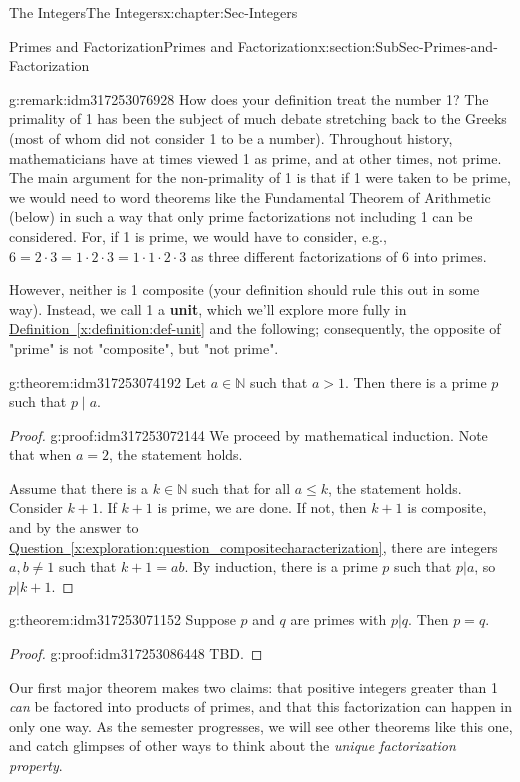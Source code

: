 \documentclass[oneside,10pt,]{book}
\newcommand{\xreffont}{\relax}
\newcommand{\terminology}[1]{\textbf{#1}}
\numberwithin{equation}{section}
\renewcommand{\le}{\leqslant}
\def\N{{\mathbb N}}
\begin{document}
\begin{chapterptx}{The Integers}{}{The Integers}{}{}{x:chapter:Sec-Integers}
\begin{sectionptx}{Primes and Factorization}{}{Primes and Factorization}{}{}{x:section:SubSec-Primes-and-Factorization}
\begin{remark}{}{g:remark:idm317253076928}%
How does your definition treat the number 1? The primality of 1 has been the subject of much debate stretching back to the Greeks (most of whom did not consider 1 to be a number). Throughout history, mathematicians have at times viewed 1 as prime, and at other times, not prime. The main argument for the non-primality of 1 is that if 1 were taken to be prime, we would need to word theorems like the Fundamental Theorem of Arithmetic (below) in such a way that only prime factorizations not including 1 can be considered. For, if 1 is prime, we would have to consider, e.g., \(6 = 2\cdot 3 = 1\cdot 2 \cdot 3 = 1\cdot 1\cdot 2\cdot 3\) as three different factorizations of 6 into primes.%
\par
However, neither is 1 composite (your definition should rule this out in some way). Instead, we call 1 a \terminology{unit}, which we'll explore more fully in \hyperref[x:definition:def-unit]{Definition~{\xreffont\ref{x:definition:def-unit}}} and the following; consequently, the opposite of "prime" is not "composite", but "not prime".%
\end{remark}
\begin{theorem}{}{}{g:theorem:idm317253074192}%
Let \(a\in \N\) such that \(a > 1\). Then there is a prime \(p\) such that \(p\mid a\).%
\end{theorem}
\begin{proof}{}{g:proof:idm317253072144}
We proceed by mathematical induction. Note that when \(a = 2\), the statement holds.%
\par
Assume that there is a \(k\in\N\) such that for all \(a\le k\), the statement holds. Consider \(k+1\). If \(k+1\) is prime, we are done. If not, then \(k+1\) is composite, and by the answer to \hyperref[x:exploration:question_compositecharacterization]{Question~{\xreffont\ref{x:exploration:question_compositecharacterization}}}, there are integers \(a,b\ne 1\) such that \(k+1 = ab\). By induction, there is a prime \(p\) such that \(p|a\), so \(p|k+1\).%
\end{proof}
\begin{theorem}{}{}{g:theorem:idm317253071152}%
Suppose \(p\) and \(q\) are primes with \(p|q\). Then \(p = q\).%
\end{theorem}
\begin{proof}{}{g:proof:idm317253086448}
TBD.\end{proof}
Our first major theorem makes two claims: that positive integers greater than 1 \emph{can} be factored into products of primes, and that this factorization can happen in only one way. As the semester progresses, we will see other theorems like this one, and catch glimpses of other ways to think about the \emph{unique factorization property}.%

\end{sectionptx}
\end{chapterptx}
\end{document}
